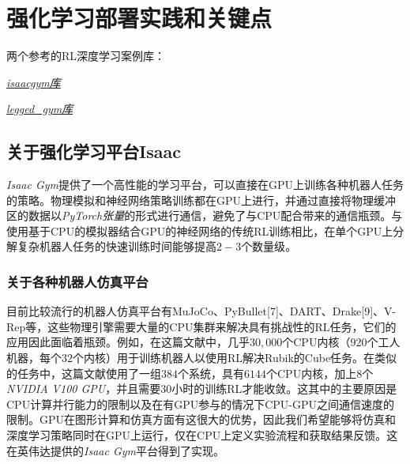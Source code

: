 
\chapter[强化学习部署实践和关键点]{强化学习部署实践和关键点}
\begin{note}
  两个参考的RL深度学习案例库：

  \emph{\href{https://github.com/DaojiePENG}{isaacgym库}}

  \emph{\href{https://github.com/DaojiePENG}{legged\_gym库}}
\end{note}

\section[强化学习平台Isaac]{关于强化学习平台Isaac\cite[p4-10]{Makoviychuk_Wawrzyniak_Guo_Lu_Storey_Macklin_Hoeller_Rudin_Allshire_Handa_et_al_2021}}


\emph{Isaac Gym}提供了一个高性能的学习平台，可以直接在GPU上训练各种机器人任务的策略。物理模拟和神经网络策略训练都在GPU上进行，并通过直接将物理缓冲区的数据以\emph{PyTorch张量}的形式进行通信，避免了与CPU配合带来的通信瓶颈。与使用基于CPU的模拟器结合GPU的神经网络的传统RL训练相比，在单个GPU上分解复杂机器人任务的快速训练时间能够提高$2-3$个数量级\cite[p1]{Makoviychuk_Wawrzyniak_Guo_Lu_Storey_Macklin_Hoeller_Rudin_Allshire_Handa_et_al_2021}。

\subsection[关于各种机器人仿真平台]{关于各种机器人仿真平台}
目前比较流行的机器人仿真平台有MuJoCo\cite[p]{Todorov_Erez_Tassa_2012}、PyBullet[7]、DART\cite[p]{Lee_X_Grey_Ha_Kunz_Jain_Ye_S_Srinivasa_Stilman_Karen_Liu_2018}、Drake[9]、V-Rep\cite[p]{Rohmer_Singh_Freese_2013}等，这些物理引擎需要大量的CPU集群来解决具有挑战性的RL任务，它们的应用因此面临着瓶颈。例如，在这篇文献\cite[p]{OpenAI_Akkaya_Andrychowicz_Chociej_Litwin_McGrew_Petron_Paino_Plappert_Powell_et_al_2019}中，几乎$30,000$个CPU内核（$920$个工人机器，每个$32$个内核）用于训练机器人以使用RL解决Rubik的Cube任务。在类似的任务中，这篇文献\cite[p]{Andrychowicz_Baker_Chociej_Józefowicz_McGrew_Pachocki_Petron_Plappert_Powell_Ray_et_al_2020}使用了一组$384$个系统，具有$6144$个CPU内核，加上$8$个\emph{NVIDIA V100 GPU}，并且需要$30$小时的训练RL才能收敛。这其中的主要原因是CPU计算并行能力的限制以及在有GPU参与的情况下CPU-GPU之间通信速度的限制。GPU在图形计算和仿真方面有这很大的优势，因此我们希望能够将仿真和深度学习策略同时在GPU上运行，仅在CPU上定义实验流程和获取结果反馈。这在英伟达提供的\emph{Isaac Gym}平台得到了实现。
